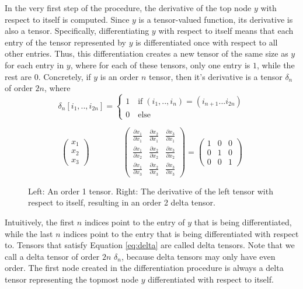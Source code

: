 \documentclass[12pt, a4paper]{report}
\begin{document}
In the very first step of the procedure, the derivative of the top node $y$ with respect to itself is computed.
Since $y$ is a tensor-valued function, its derivative is also a tensor.
Specifically, differentiating $y$ with respect to itself means that each entry of the tensor represented by $y$ is differentiated once with respect to all other entries.
Thus, this differentiation creates a new tensor of the same size as $y$ for each entry in $y$, where for each of these tensors, only one entry is $1$, while the rest are $0$.
Concretely, if $y$ is an order $n$ tensor, then it's derivative is a tensor $\delta_n$ of order $2n$, where
\begin{equation}
    \delta_n[i_1,..,i_{2n}] = 
    \begin{cases}
        1 \quad \text{if} \; (i_1,..,i_n) = (i_{n+1}...i_{2n}) \\
        0 \quad \text{else}
    \end{cases}
    \label{eq:delta}
\end{equation}
\begin{figure}
    $$
    \begin{pmatrix}
        x_1\\
        x_2\\
        x_3
    \end{pmatrix} \quad \quad \quad \quad 
    \begin{pmatrix}
        \frac{\partial x_1}{\partial x_1} & \frac{\partial x_2}{\partial x_1} & \frac{\partial x_3}{\partial x_1} \\
        \frac{\partial x_1}{\partial x_2} & \frac{\partial x_2}{\partial x_2} & \frac{\partial x_3}{\partial x_2} \\
        \frac{\partial x_1}{\partial x_3} & \frac{\partial x_2}{\partial x_3} & \frac{\partial x_3}{\partial x_3}
    \end{pmatrix}
    =
    \begin{pmatrix}
        1 & 0 & 0 \\
        0 & 1 & 0 \\
        0 & 0 & 1
    \end{pmatrix}
    $$
    \caption{Left: An order 1 tensor. Right: The derivative of the left tensor with respect to itself, resulting in an order 2 delta tensor.}
\end{figure}
Intuitively, the first $n$ indices point to the entry of $y$ that is being differentiated, while the last $n$ indices point to the entry that is being differentiated with respect to.
Tensors that satisfy Equation \ref{eq:delta} are called delta tensors.
Note that we call a delta tensor of order $2n$ $\delta_n$, because delta tensors may only have even order.
The first node created in the differentiation procedure is always a delta tensor representing the topmost node $y$ differentiated with respect to itself.
\end{document}
